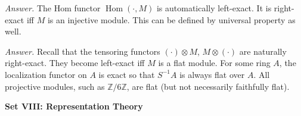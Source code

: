\documentclass{mathproblems}
\newcommand\Z{\mathbb{Z}}
\DeclareMathOperator{\Hom}{Hom}
\begin{document}
\begin{questions}

\textit{Answer.} The Hom functor $\Hom(\cdot,M)$ is automatically left-exact. It is right-exact iff $M$ is an injective module. This can be defined by universal property as well.


\textit{Answer.} Recall that the tensoring functors $(\cdot)\otimes M$, $M\otimes (\cdot)$ are naturally right-exact. They become left-exact iff $M$ is a flat module. For some ring $A$, the localization functor on $A$ is exact so that $S^{-1}A$ is always flat over $A$. All projective modules, such as $\Z/6\Z$, are flat (but not necessarily faithfully flat).

\end{questions}

\newpage
\centerline{\textbf{Set VIII: Representation Theory}}
\end{document}
